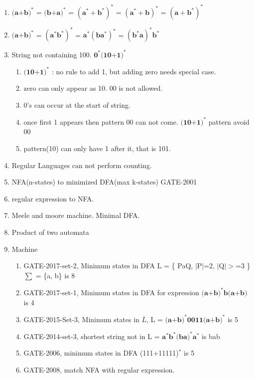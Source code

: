 \begin{enumerate}
    \item \( \mathbf { \text{(a+b)}^* } \) = \( \mathbf { \text{(b+a)}^* } \)
        = \( \mathbf { (\text{a}^* + \text{b}^*)^*} \) = \( \mathbf { (\text{a}^* + \text{b})^*} \)  = \( \mathbf { (\text{a} + \text{b}^*)^*} \)
    \item \( \mathbf { \text{(a+b)}^* } \) = \( \mathbf { (\text{a}^*\text{b}^*)^*} \) = \( \mathbf { \text{a}^* (\text{b}\text{a}^*)^* } \)
        = \( \mathbf { (\text{b}^*\text{a})^* \text{b}^* } \)
    \item String not containing 100. \qquad \( \mathbf { \text{0}^*\text{(10+1)}^* } \)
    \begin{enumerate}
        \item \( \mathbf { \text{(10+1)}^* } \) : no rule to add 1, but adding zero needs special case.
        \item zero can only appear as 10. 00 is not allowed.
        \item 0's can occur at the start of string.
        \item once first 1 appears then pattern 00 can not come. \( \mathbf { \text{(10+1)}^* } \) pattern avoid 00
        \item pattern(10) can only have 1 after it, that is 101.
    \end{enumerate}
    \item Regular Languages can not perform counting.
    \item NFA(n-states) to minimized DFA(max k-states) GATE-2001
    \item regular expression to NFA.
    \item Meele and moore machine. Minimal DFA.
    \item Product of two automata
    \item Machine
    \begin{enumerate}
    \item GATE-2017-set-2, Minimum states in DFA \quad L = \{ PaQ,  \( |\text{P}|\text{=2, } | \text{Q}|>\text{=3} \) \}
          \quad \(\sum\) = \{a, b\} is 8
    \item GATE-2017-set-1, Minimum states in DFA for expression \( \mathbf { \text{(a+b)}^* \text{b} \text{(a+b)} } \)  is 4
    \item GATE-2015-Set-3, Minimum states in \( \overline{L} \), L = \( \mathbf { \text{(a+b)}^* \text{0011} \text{(a+b)}^* } \)  is 5
    \item GATE-2014-set-3, shortest string not in L =  \( \mathbf { \text{a}^*\text{b}^*\text{(ba)}^*\text{a}^*} \) is bab
    \item GATE-2006, minimum states in DFA (111+11111)\(^*\) is 5
    \item GATE-2008, match NFA with regular expression.

    \end{enumerate}
\end{enumerate}


\begin{comment}

    \( \mathbf {  } \)  \text{a}^\text{b}  \text{a}^*

    (00)^*   \lambda   \phi

\end{comment}
